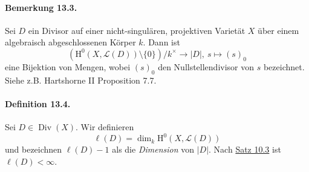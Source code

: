 \paragraph{Bemerkung 13.3.}\label{13.3} Sei $D$ ein Divisor auf einer nicht-singulären, projektiven Varietät $X$ über einem algebraisch abgeschlossenen Körper $k$. Dann ist
\[(\mathrm{H}^0(X,\mathcal{L}(D))\setminus\{0\})/k^\times\to |D|,\ s\mapsto (s)_0 \]
eine Bijektion von Mengen, wobei $(s)_0$ den Nullstellendivisor von $s$ bezeichnet. Siehe z.B. Hartshorne II Proposition 7.7.

\paragraph{Definition 13.4.}\label{13.4} Sei $D\in\operatorname{Div}(X)$. Wir definieren
\[\ell(D)=\dim_k\mathrm{H}^0(X,\mathcal{L}(D)) \]
und bezeichnen $\ell(D)-1$ als die \textit{Dimension} von $|D|$. Nach \hyperref[10.3]{Satz 10.3} ist $\ell(D)<\infty$.
